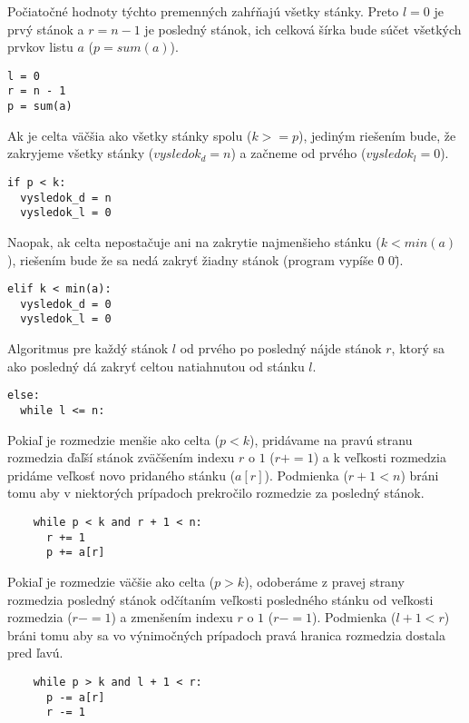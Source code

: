\documentclass{article}
\begin{document}
Počiatočné hodnoty týchto premenných zahŕňajú všetky stánky. Preto $l = 0$ je prvý stánok a $r = n - 1$ je posledný stánok, ich celková šírka bude súčet všetkých prvkov listu $a$ ($p = sum(a)$).

\begin{lstlisting}
l = 0
r = n - 1
p = sum(a)
\end{lstlisting}

Ak je celta väčšia ako všetky stánky spolu ($k >= p$), jediným riešením bude, že zakryjeme všetky stánky ($vysledok_d = n$) a začneme od prvého ($vysledok_l = 0$).

\begin{lstlisting}
if p < k:
  vysledok_d = n
  vysledok_l = 0
\end{lstlisting}

Naopak, ak celta nepostačuje ani na zakrytie najmenšieho stánku ($k < min(a)$), riešením bude že sa nedá zakryť žiadny stánok (program vypíše \"0 0\").

\begin{lstlisting}
elif k < min(a):
  vysledok_d = 0
  vysledok_l = 0
\end{lstlisting}

Algoritmus pre každý stánok $l$ od prvého po posledný nájde stánok $r$, ktorý sa ako posledný dá zakryť celtou natiahnutou od stánku $l$.

\begin{lstlisting}
else:
  while l <= n:
\end{lstlisting}

Pokiaľ je rozmedzie menšie ako celta ($p < k$), pridávame na pravú stranu rozmedzia ďaľší stánok zväčšením indexu $r$ o $1$ ($r += 1$) a k veľkosti rozmedzia pridáme veľkosť novo pridaného stánku ($a[r]$).
Podmienka ($r + 1 < n$) bráni tomu aby v niektorých prípadoch prekročilo rozmedzie za posledný stánok.

\begin{lstlisting}
    while p < k and r + 1 < n:
      r += 1
      p += a[r]
\end{lstlisting}

Pokiaľ je rozmedzie väčšie ako celta ($p > k$), odoberáme z pravej strany rozmedzia posledný stánok odčítaním veľkosti posledného stánku od veľkosti rozmedzia ($r -= 1$) a zmenšením indexu $r$ o $1$ ($r -= 1$).
Podmienka ($l + 1 < r$) bráni tomu aby sa vo výnimočných prípadoch pravá hranica rozmedzia dostala pred ľavú.

\begin{lstlisting}
    while p > k and l + 1 < r:
      p -= a[r]
      r -= 1
\end{lstlisting}
\end{document}
